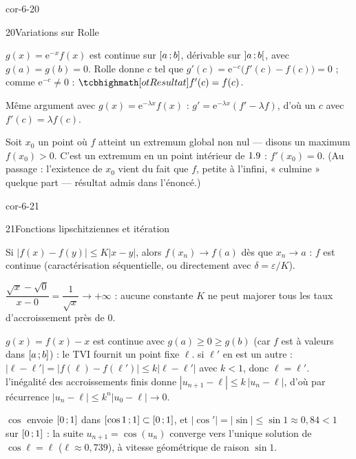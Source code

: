 \begin{blocLivre}{cor-6-20}
\begin{corrige}{20}{Variations sur Rolle}
\begin{questions}
  \item $g(x)=\mathrm{e}^{-x}f(x)$ est continue sur $\mathopen{[}a\,{;}\,b\mathclose{]}$,
    dérivable sur $\mathopen{]}a\,{;}\,b\mathclose{[}$, avec $g(a)=g(b)=0$. Rolle donne $c$ tel
    que $g'(c)=\mathrm{e}^{-c}\bigl(f'(c)-f(c)\bigr)=0$ ; comme
    $\mathrm{e}^{-c}\neq0$ : $\res{f'(c)=f(c)}$.
  \item Même argument avec $g(x)=\mathrm{e}^{-\lambda x}f(x)$ :
    $g'=\mathrm{e}^{-\lambda x}(f'-\lambda f)$, d'où un $c$ avec
    $f'(c)=\lambda f(c)$.
  \item Soit $x_0$ un point où $f$ atteint un extremum global non nul —
    disons un maximum $f(x_0)>0$. C'est un extremum en un point intérieur
    de $1.9$ : $f'(x_0)=0$. (Au passage : l'existence de $x_0$ vient du fait
    que $f$, petite à l'infini, « culmine » quelque part — résultat admis
    dans l'énoncé.)
\end{questions}
\end{corrige}
\end{blocLivre}

\begin{blocLivre}{cor-6-21}
\begin{corrige}{21}{Fonctions lipschitziennes et itération}
\begin{questions}
  \item Si $|f(x)-f(y)|\leq K|x-y|$, alors $f(x_n)\to f(a)$ dès que
    $x_n\to a$ : $f$ est continue (caractérisation séquentielle, ou
    directement avec $\delta=\varepsilon/K$).
  \item $\dfrac{\sqrt x-\sqrt0}{x-0}=\dfrac{1}{\sqrt x}\to+\infty$ : aucune
    constante $K$ ne peut majorer tous les taux d'accroissement près de
    $0$.
  \item {} $g(x)=f(x)-x$ est continue avec $g(a)\geq0\geq g(b)$
    (car $f$ est à valeurs dans $\mathopen{[}a\,{;}\,b\mathclose{]}$) : le TVI fournit un point
    fixe $\ell$.  si $\ell'$ en est un autre :
    $|\ell-\ell'|=|f(\ell)-f(\ell')|\leq k|\ell-\ell'|$ avec $k<1$, donc
    $\ell=\ell'$.  l'inégalité des accroissements finis
    donne $|u_{n+1}-\ell|\leq k\,|u_n-\ell|$, d'où par récurrence
    $|u_n-\ell|\leq k^{n}|u_0-\ell|\to0$.
  \item $\cos$ envoie $\mathopen{[}0\,{;}\,1\mathclose{]}$ dans $\mathopen{[}\cos1\,{;}\,1\mathclose{]}\subset\mathopen{[}0\,{;}\,1\mathclose{]}$,
    et $|\cos'|=|\sin|\leq\sin1\approx0{,}84<1$ sur $\mathopen{[}0\,{;}\,1\mathclose{]}$ : la
    suite $u_{n+1}=\cos(u_n)$ converge vers l'unique solution de
    $\cos\ell=\ell$ ($\ell\approx0{,}739$), à vitesse géométrique de raison
    $\sin1$.
\end{questions}
\end{corrige}
\end{blocLivre}

